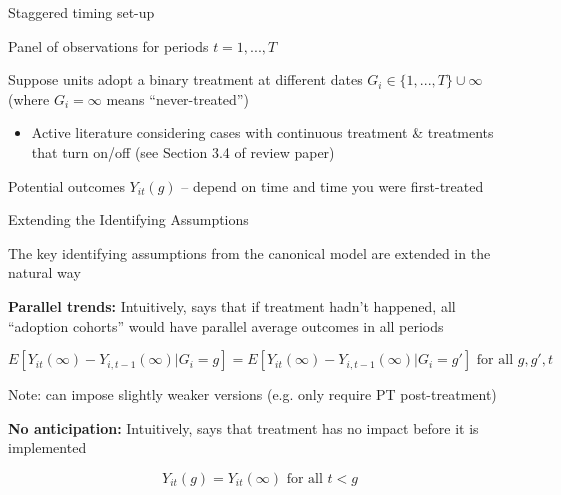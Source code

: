 \documentclass[aspectratio = 169, 13pt]{beamer}
\begin{document}
\begin{frame}{Staggered timing set-up}
	\begin{wideitemize}
		\item
		Panel of observations for periods $t = 1,...,T$
		
		\item
		Suppose units adopt a binary treatment at different dates $G_i \in \{1,...,T \} \cup \infty$ \\ (where $G_i = \infty$ means ``never-treated'')
		\begin{itemize}
			\item
			Active literature considering cases with continuous treatment \& treatments that turn on/off (see Section 3.4 of review paper)
		\end{itemize}
		
		\item
		Potential outcomes $Y_{it}(g)$ -- depend on time and time you were first-treated
		
	\end{wideitemize}
\end{frame}


\begin{frame}{Extending the Identifying Assumptions}
	\begin{wideitemize}
		\item
		The key identifying assumptions from the canonical model are extended in the natural way
		
		\item
		\textbf{Parallel trends:} Intuitively, says that if treatment hadn't happened, all ``adoption cohorts'' would have parallel average outcomes in all periods
		
		$$ E[ Y_{it}(\infty) - Y_{i,t-1}(\infty) | G_i = g ] = E[ Y_{it}(\infty) - Y_{i,t-1}(\infty) | G_i = g' ] \text{ for all } g,g',t$$
		
		
		Note: can impose slightly weaker versions (e.g. only require PT post-treatment)
		
		\item
		\textbf{No anticipation:} Intuitively, says that treatment has no impact before it is implemented
		
		$$Y_{it}(g) = Y_{it}(\infty) \text{ for all } t<g$$
	\end{wideitemize}
\end{frame}
\end{document}
